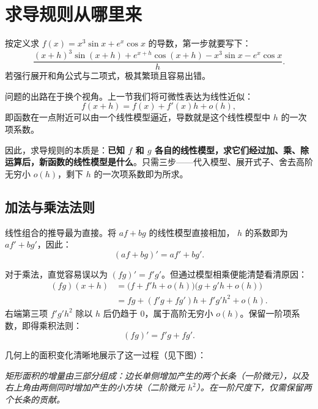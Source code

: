 \section{求导规则从哪里来}
\label{sec:02-Calculus/03-Differentiation/02}

按定义求 \(f(x)=x^3\sin x+e^x\cos x\) 的导数，第一步就要写下：
\[
\frac{(x+h)^3\sin(x+h)+e^{x+h}\cos(x+h)-x^3\sin x-e^x\cos x}{h}.
\]
若强行展开和角公式与二项式，极其繁琐且容易出错。

问题的出路在于换个视角。上一节我们将可微性表达为线性近似：
\[
f(x+h)=f(x)+f'(x)h+o(h),
\]
即函数在一点附近可以由一个线性模型逼近，导数就是这个线性模型中 \(h\) 的一次项系数。

因此，求导规则的本质是：\textbf{已知 \(f\) 和 \(g\) 各自的线性模型，求它们经过加、乘、除运算后，新函数的线性模型是什么}。只需三步——代入模型、展开式子、舍去高阶无穷小 \(o(h)\)，剩下 \(h\) 的一次项系数即为所求。

\subsection{加法与乘法法则}

线性组合的推导最为直接。将 $af+bg$ 的线性模型直接相加， $h$ 的系数即为 $af'+bg'$，因此：
\[
(af+bg)' = af'+bg'.
\]

对于乘法，直觉容易误以为 \((fg)'=f'g'\)。但通过模型相乘便能清楚看清原因：
\[
\begin{aligned}
(fg)(x+h) &= \bigl(f+f'h+o(h)\bigr)\bigl(g+g'h+o(h)\bigr) \\
&= fg+(f'g+fg')h+f'g'h^2+o(h).
\end{aligned}
\]
右端第三项 \(f'g'h^2\) 除以 \(h\) 后仍趋于 \(0\)，属于高阶无穷小 \(o(h)\)。保留一阶项系数，即得乘积法则：
\[
(fg)'=f'g+fg'.
\]

几何上的面积变化清晰地展示了这一过程（见下图）：

\begin{center}

\emph{矩形面积的增量由三部分组成：边长单侧增加产生的两个长条（一阶微元），以及右上角由两侧同时增加产生的小方块（二阶微元 \(h^2\)）。在一阶尺度下，仅需保留两个长条的贡献。}
\end{center}

